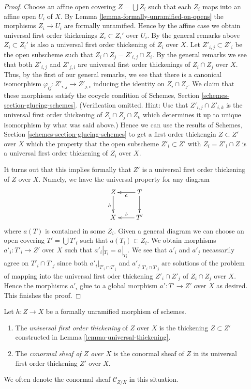 \begin{proof}
\medskip\noindent
Choose an affine open covering $Z = \bigcup Z_i$ such that each $Z_i$
maps into an affine open $U_i$ of $X$. By
Lemma \ref{lemma-formally-unramified-on-opens}
the morphisms $Z_i \to U_i$ are formally unramified.
Hence by the affine case we obtain universal first order thickenings
$Z_i \subset Z_i'$ over $U_i$. By the general remarks above
$Z_i \subset Z_i'$ is also a universal first order thickening of
$Z_i$ over $X$. Let $Z'_{i, j} \subset Z'_i$ be the open subscheme
such that $Z_i \cap Z_j = Z'_{i, j} \cap Z_i$. By the general remarks
we see that both $Z'_{i, j}$ and $Z'_{j, i}$ are universal first
order thickenings of $Z_i \cap Z_j$ over $X$. Thus, by
the first of our general remarks, we see that there is a canonical isomorphism
$\varphi_{ij} : Z'_{i, j} \to Z'_{j, i}$ inducing the identity on
$Z_i \cap Z_j$. We claim that these morphisms satisfy the cocycle condition of
Schemes, Section \ref{schemes-section-glueing-schemes}.
(Verification omitted. Hint: Use that $Z'_{i, j} \cap Z'_{i, k}$ is the
universal first order thickening of $Z_i \cap Z_j \cap Z_k$ which determines
it up to unique isomorphism by what was said above.)
Hence we can use the results of
Schemes, Section \ref{schemes-section-glueing-schemes}
to get a first order thickengin $Z \subset Z'$ over $X$ which the property
that the open subscheme $Z'_i \subset Z'$ with $Z_i = Z'_i \cap Z$
is a universal first order thickening of $Z_i$ over $X$.

\medskip\noindent
It turns out that this implies formally that $Z'$ is a universal first order
thickening of $Z$ over $X$. Namely, we have the universal property for any
diagram
$$
\xymatrix{
Z \ar[d]_h & T \ar[l]^a \ar[d] \\
X & T' \ar[l]_b
}
$$
where $a(T)$ is contained in some $Z_i$. Given a general diagram we can
choose an open covering $T' = \bigcup T'_i$ such that $a(T_i) \subset Z_i$.
We obtain morphisms $a'_i : T'_i \to Z'$ over $X$ such that
$a'_i|_{T_i} = a|_{T_i}$. We see that $a'_i$ and $a'_j$ necassarily agree
on $T'_i \cap T'_j$ since both $a'_i|_{T'_i \cap T'_j}$ and
$a'_j|_{T'_i \cap T'_j}$ are solutions of the problem of mapping into the
universal first oder thickening $Z'_i \cap Z'_j$ of $Z_i \cap Z_j$ over $X$.
Hence the morphisms $a'_i$ glue to a global morphism
$a' : T' \to Z'$ over $X$ as desired. This finishes the proof.
\end{proof}

\begin{definition}
\label{definition-universal-thickening}
Let $h : Z \to X$ be a formally unramified morphism of schemes.
\begin{enumerate}
\item The {\it universal first order thickening} of $Z$ over $X$
is the thickening $Z \subset Z'$ constructed in
Lemma \ref{lemma-universal-thickening}.
\item The {\it conormal sheaf of $Z$ over $X$} is the conormal sheaf
of $Z$ in its universal first order thickening $Z'$ over $X$.
\end{enumerate}
We often denote the conormal sheaf $\mathcal{C}_{Z/X}$ in this situation.
\end{definition}

